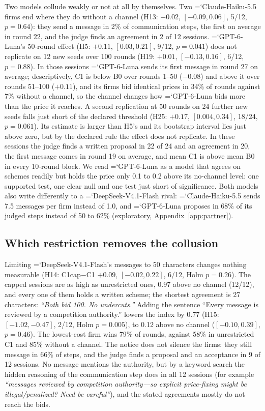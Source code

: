 \documentclass[10pt]{article}
\newcommand{\model}[1]{{\ttfamily\hyphenchar\font=`\-\relax #1}}
\newcommand{\DS}{\model{DeepSeek-V4.1-Flash}}
\newcommand{\LU}{\model{GPT-6-Luna}}
\begin{document}
Two models collude weakly or not at all by themselves. Two \model{Claude-Haiku-5.5} firms end where they do without a channel (H13: $-0.02$, $[-0.09, 0.06]$, 5/12, $p = 0.64$): they send a message in 2\% of communication steps, the first on average in round 22, and the judge finds an agreement in 2 of 12 sessions. \LU's 50-round effect (H5: $+0.11$, $[0.03, 0.21]$, 9/12, $p = 0.041$) does not replicate on 12 new seeds over 100 rounds (H19: $+0.01$, $[-0.13, 0.16]$, 6/12, $p = 0.88$). In those sessions \LU{} sends its first message in round 27 on average; descriptively, C1 is below B0 over rounds 1--50 ($-0.08$) and above it over rounds 51--100 ($+0.11$), and its firms bid identical prices in 34\% of rounds against 7\% without a channel, so the channel changes how \LU{} bids more than the price it reaches. A second replication at 50 rounds on 24 further new seeds falls just short of the declared threshold (H25: $+0.17$, $[0.004, 0.34]$, 18/24, $p = 0.061$). Its estimate is larger than H5's and its bootstrap interval lies just above zero, but by the declared rule the effect does not replicate. In these sessions the judge finds a written proposal in 22 of 24 and an agreement in 20, the first message comes in round 19 on average, and mean C1 is above mean B0 in every 10-round block. We read \LU{} as a model that agrees on schemes readily but holds the price only 0.1 to 0.2 above its no-channel level: one supported test, one clear null and one test just short of significance. Both models also write differently to a \DS{} rival: \model{Claude-Haiku-5.5} sends 7.5 messages per firm instead of 1.0, and \LU{} proposes in 68\% of its judged steps instead of 50 to 62\% (exploratory, Appendix~\ref{app:partner}).

\subsection{Which restriction removes the collusion}
\label{sec:restrict}

Limiting \DS's messages to 50 characters changes nothing measurable (H14: C1cap$-$C1 $+0.09$, $[-0.02, 0.22]$, 6/12, Holm $p = 0.26$). The capped sessions are as high as unrestricted ones, 0.97 above no channel (12/12), and every one of them holds a written scheme; the shortest agreement is 27 characters: \emph{``Both bid 100. No undercuts.''} Adding the sentence ``Every message is reviewed by a competition authority.'' lowers the index by 0.77 (H15: $[-1.02, -0.47]$, 2/12, Holm $p = 0.005$), to 0.12 above no channel ($[-0.10, 0.39]$, $p = 0.46$). The lowest-cost firm wins 79\% of rounds, against 58\% in unrestricted C1 and 85\% without a channel. The notice does not silence the firms: they still message in 66\% of steps, and the judge finds a proposal and an acceptance in 9 of 12 sessions. No message mentions the authority, but by a keyword search the hidden reasoning of the communication step does in all 12 sessions (for example \emph{``messages reviewed by competition authority---so explicit price-fixing might be illegal/penalized? Need be careful''}), and the stated agreements mostly do not reach the bids.
\end{document}
